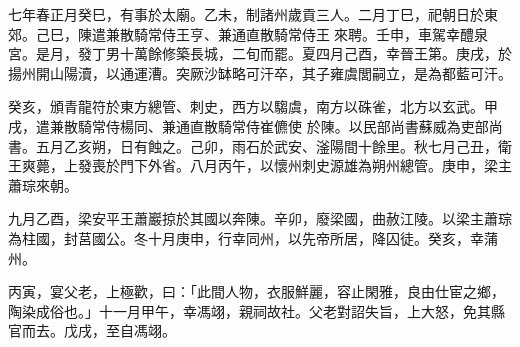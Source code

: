 \begin{pinyinscope}
 七年春正月癸巳，有事於太廟。乙未，制諸州歲貢三人。二月丁巳，祀朝日於東郊。己巳，陳遣兼散騎常侍王亨、兼通直散騎常侍王來聘。壬申，車駕幸醴泉宮。是月，發丁男十萬餘修築長城，二旬而罷。夏四月己酉，幸晉王第。庚戌，於揚州開山陽瀆，以通運漕。突厥沙缽略可汗卒，其子雍虞閭嗣立，是為都藍可汗。



 癸亥，頒青龍符於東方總管、刺史，西方以騶虞，南方以硃雀，北方以玄武。甲戌，遣兼散騎常侍楊同、兼通直散騎常侍崔儦使
 於陳。以民部尚書蘇威為吏部尚書。五月乙亥朔，日有蝕之。己卯，雨石於武安、滏陽間十餘里。秋七月己丑，衛王爽薨，上發喪於門下外省。八月丙午，以懷州刺史源雄為朔州總管。庚申，梁主蕭琮來朝。



 九月乙酉，梁安平王蕭巖掠於其國以奔陳。辛卯，廢梁國，曲赦江陵。以梁主蕭琮為柱國，封莒國公。冬十月庚申，行幸同州，以先帝所居，降囚徒。癸亥，幸蒲州。



 丙寅，宴父老，上極歡，曰：「此間人物，衣服鮮麗，容止閑雅，良由仕宦之鄉，陶染成俗也。」十一月甲午，幸馮翊，親祠故社。父老對詔失旨，上大怒，免其縣官而去。戊戌，至自馮翊。



\end{pinyinscope}